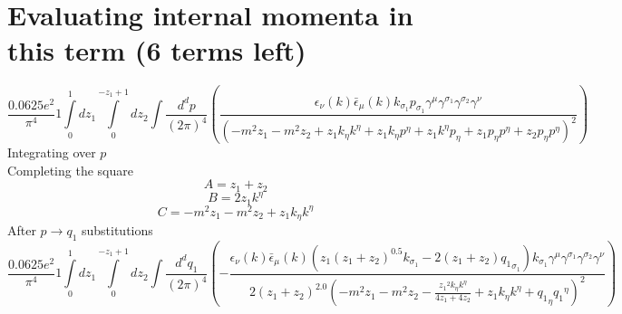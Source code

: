 \section*{Evaluating internal momenta in this term (6 terms left)}
\begin{dmath}\frac{0.0625 e^{2}}{\pi^{4}}1\int\limits_{ 0 }^{ 1 } d{ z_{ 1 } }\int\limits_{ 0 }^{ - { z_{ 1 } } + 1 } d{ z_{ 2 } }\int\frac{d^d p }{ (2\pi)^4 }\left(\frac{\epsilon_{ \nu }({ k }) \bar{\epsilon}_{ \mu }({ k }) { { k }_{ \sigma_1 } } { { p }_{ \sigma_1 } } { \gamma^{ \mu } } { \gamma^{ \sigma_1 } } { \gamma^{ \sigma_2 } } { \gamma^{ \nu } }}{\left(- m^{2} { z_{ 1 } } - m^{2} { z_{ 2 } } + { z_{ 1 } } { { k }_{ \eta } } { { k }^{ \eta } } + { z_{ 1 } } { { k }_{ \eta } } { { p }^{ \eta } } + { z_{ 1 } } { { k }^{ \eta } } { { p }_{ \eta } } + { z_{ 1 } } { { p }_{ \eta } } { { p }^{ \eta } } + { z_{ 2 } } { { p }_{ \eta } } { { p }^{ \eta } }\right)^{2}}\right)\end{dmath}
Integrating over $p$\\
Completing the square\
\begin{dmath}A = { z_{ 1 } } + { z_{ 2 } }\end{dmath}
\begin{dmath}B = 2 { z_{ 1 } } { { k }^{ \eta } }\end{dmath}
\begin{dmath}C = - m^{2} { z_{ 1 } } - m^{2} { z_{ 2 } } + { z_{ 1 } } { { k }_{ \eta } } { { k }^{ \eta } }\end{dmath}
After $p \to q_1$ substitutions
\begin{dmath}\frac{0.0625 e^{2}}{\pi^{4}}1\int\limits_{ 0 }^{ 1 } d{ z_{ 1 } }\int\limits_{ 0 }^{ - { z_{ 1 } } + 1 } d{ z_{ 2 } }\int\frac{d^d q_1 }{ (2\pi)^4 }\left(- \frac{\epsilon_{ \nu }({ k }) \bar{\epsilon}_{ \mu }({ k }) \left({ z_{ 1 } } \left({ z_{ 1 } } + { z_{ 2 } }\right)^{0.5} { { k }_{ \sigma_1 } } - 2 \left({ z_{ 1 } } + { z_{ 2 } }\right) { { q_1 }_{ \sigma_1 } }\right) { { k }_{ \sigma_1 } } { \gamma^{ \mu } } { \gamma^{ \sigma_1 } } { \gamma^{ \sigma_2 } } { \gamma^{ \nu } }}{2 \left({ z_{ 1 } } + { z_{ 2 } }\right)^{2.0} \left(- m^{2} { z_{ 1 } } - m^{2} { z_{ 2 } } - \frac{{ z_{ 1 } }^{2} { { k }_{ \eta } } { { k }^{ \eta } }}{4 { z_{ 1 } } + 4 { z_{ 2 } }} + { z_{ 1 } } { { k }_{ \eta } } { { k }^{ \eta } } + { { q_1 }_{ \eta } } { { q_1 }^{ \eta } }\right)^{2}}\right)\end{dmath}
